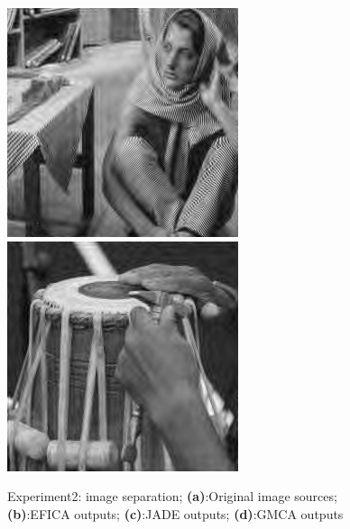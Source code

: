 \begin{figure}
{\begin{minipage}[b]{0.23\linewidth}
\includegraphics[width=1\linewidth]{images/gmca_out3.png}\vspace{4pt}
\includegraphics[width=1\linewidth]{images/gmca_out4.png}
\end{minipage}}
\caption{Experiment2: image separation; \textbf{(a)}:Original image sources; \textbf{(b)}:EFICA outputs; \textbf{(c)}:JADE outputs; \textbf{(d)}:GMCA outputs }
\end{figure}
